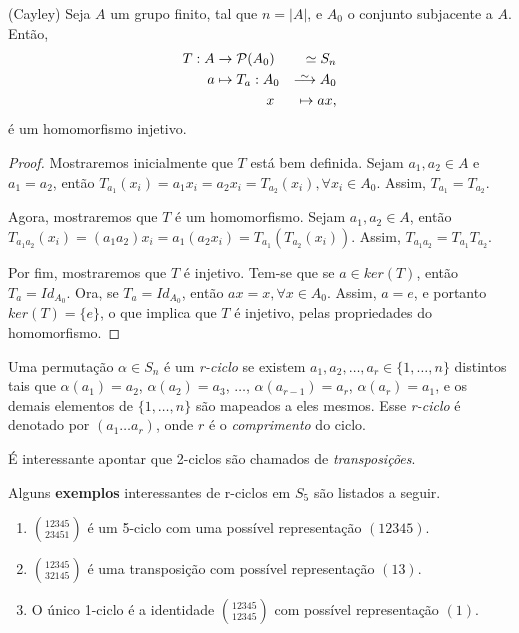 \documentclass[11pt,openany]{book}
\newcommand\isomto{\stackrel{\sim}{\smash{\longrightarrow}\rule{0pt}{0.4ex}}}
\begin{document}
\begin{theorem}
\label{theo:teorema_de_Cayley}
    (Cayley) Seja $A$ um grupo finito, tal que $n = |A|$, e $A_0$ o conjunto subjacente a $A$. Então,
    \begin{alignat*}{3}
        T:  A &\rightarrow \mathcal{P}(A_0) &\simeq S_n\\
            a &\mapsto T_a : A_0 &\isomto A_0\\
            &\phantom{a \mapsto T_a : } x &\mapsto ax,
    \end{alignat*}
    é um homomorfismo injetivo.
\end{theorem}

\begin{proof}
    Mostraremos inicialmente que $T$ está bem definida. Sejam $a_1, a_2 \in A$ e $a_1 = a_2$, então $T_{a_1}(x_i) = a_1 x_i = a_2 x_i = T_{a_2}(x_i), \forall x_i \in A_0$. Assim, $T_{a_1} = T_{a_2}$.

    Agora, mostraremos que $T$ é um homomorfismo. Sejam $a_1, a_2 \in A$, então $T_{a_1a_2}(x_i) = (a_1a_2)x_i = a_1(a_2x_i) = T_{a_1}(T_{a_2}(x_i))$. Assim, $T_{a_1a_2} = T_{a_1}T_{a_2}$.

    Por fim, mostraremos que $T$ é injetivo. Tem-se que se $a \in ker(T)$, então $T_a = Id_{A_0}$. Ora, se $T_a = Id_{A_0}$, então $ax = x, \forall x \in A_0$. Assim, $a = e$, e portanto $ker(T) = \{e\}$, o que implica que $T$ é injetivo, pelas propriedades do homomorfismo.
\end{proof}

\begin{definition}
\label{def:r-ciclo}
    Uma permutação $\alpha \in S_n$ é um \textit{r-ciclo} se existem $a_1, a_2, \dots, a_r \in \{1, \dots, n\}$ distintos tais que $\alpha(a_1) = a_2$, $\alpha(a_2) = a_3$, $\dots$, $\alpha(a_{r-1}) = a_r$, $\alpha(a_r) = a_1$, e os demais elementos de $\{1, \dots, n\}$ são mapeados a eles mesmos. Esse \textit{r-ciclo} é denotado por $(a_1 \dots a_r)$, onde $r$ é o \textit{comprimento} do ciclo.
\end{definition}

É interessante apontar que 2-ciclos são chamados de \textit{transposições}.

Alguns \textbf{exemplos} interessantes de r-ciclos em $S_5$ são listados a seguir.
\begin{enumerate}[label=Exemplo \arabic*),align=left]
    \item $\binom{12345}{23451}$ é um 5-ciclo com uma possível representação $(12345)$.
    \item $\binom{12345}{32145}$ é uma transposição com possível representação $(13)$.
    \item O único 1-ciclo é a identidade $\binom{12345}{12345}$ com possível representação $(1)$.
\end{enumerate}
\end{document}
